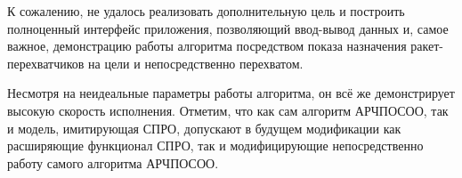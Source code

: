 К сожалению, не удалось реализовать дополнительную цель и построить полноценный интерфейс приложения, позволяющий ввод-вывод данных и, самое важное, демонстрацию работы алгоритма посредством показа назначения ракет-перехватчиков на цели и непосредственно перехватом.

Несмотря на неидеальные параметры работы алгоритма, он всё же демонстрирует высокую скорость исполнения. Отметим, что как сам алгоритм АРЧПОСОО, так и модель, имитирующая СПРО, допускают в будущем модификации как расширяющие функционал СПРО, так и модифицирующие непосредственно работу самого алгоритма АРЧПОСОО.

